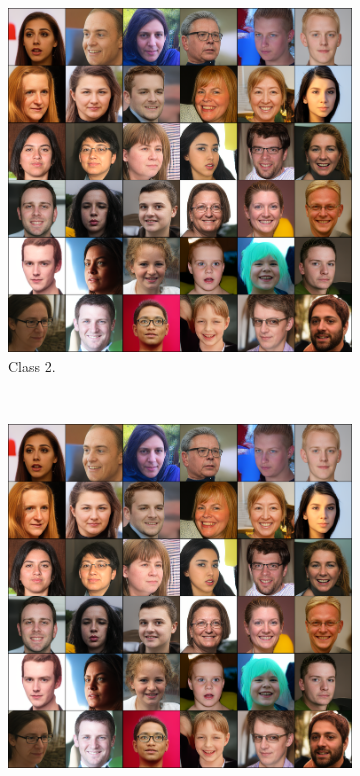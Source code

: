 \begin{figure}[ht]
\begin{subfigure}[b]{0.47\textwidth}
        \includegraphics[width=1.0\textwidth]{figures/ffhq256-samples-small.png}
        \caption{
            Class 2.
        }
    \end{subfigure}
    \\
    \begin{subfigure}[b]{0.47\textwidth}
        \centering
        \includegraphics[width=1.0\textwidth]{figures/ffhq256-samples-small.png}

\end{subfigure}
\end{figure}

